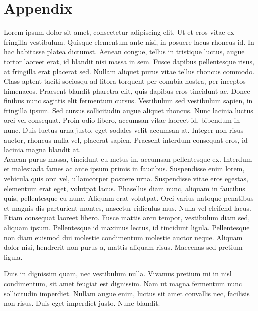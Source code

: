 \section*{\centering Appendix}

Lorem ipsum dolor sit amet, consectetur adipiscing elit. Ut et eros vitae ex fringilla vestibulum. Quisque elementum ante nisi, in posuere lacus rhoncus id. In hac habitasse platea dictumst. Aenean congue, tellus in tristique luctus, augue tortor laoreet erat, id blandit nisi massa in sem. Fusce dapibus pellentesque risus, at fringilla erat placerat sed. Nullam aliquet purus vitae tellus rhoncus commodo. Class aptent taciti sociosqu ad litora torquent per conubia nostra, per inceptos himenaeos. Praesent blandit pharetra elit, quis dapibus eros tincidunt ac. Donec finibus nunc sagittis elit fermentum cursus. Vestibulum sed vestibulum sapien, in fringilla ipsum. Sed cursus sollicitudin augue aliquet rhoncus. Nunc lacinia luctus orci vel consequat. Proin odio libero, accumsan vitae laoreet id, bibendum in nunc. Duis luctus urna justo, eget sodales velit accumsan at. Integer non risus auctor, rhoncus nulla vel, placerat sapien. Praesent interdum consequat eros, id lacinia magna blandit at. \\

Aenean purus massa, tincidunt eu metus in, accumsan pellentesque ex. Interdum et malesuada fames ac ante ipsum primis in faucibus. Suspendisse enim lorem, vehicula quis orci vel, ullamcorper posuere urna. Suspendisse vitae eros egestas, elementum erat eget, volutpat lacus. Phasellus diam nunc, aliquam in faucibus quis, pellentesque eu nunc. Aliquam erat volutpat. Orci varius natoque penatibus et magnis dis parturient montes, nascetur ridiculus mus. Nulla vel eleifend lacus. Etiam consequat laoreet libero. Fusce mattis arcu tempor, vestibulum diam sed, aliquam ipsum. Pellentesque id maximus lectus, id tincidunt ligula. Pellentesque non diam euismod dui molestie condimentum molestie auctor neque. Aliquam dolor nisi, hendrerit non purus a, mattis aliquam risus. Maecenas sed pretium ligula.

Duis in dignissim quam, nec vestibulum nulla. Vivamus pretium mi in nisl condimentum, sit amet feugiat est dignissim. Nam ut magna fermentum nunc sollicitudin imperdiet. Nullam augue enim, luctus sit amet convallis nec, facilisis non risus. Duis eget imperdiet justo. Nunc blandit.